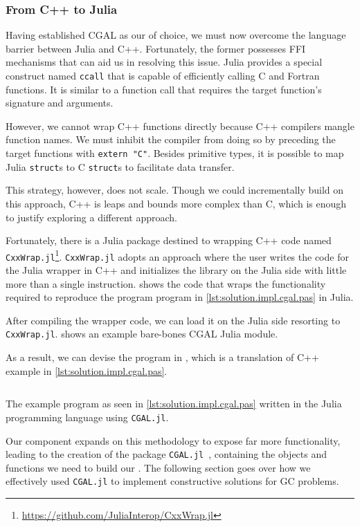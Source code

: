 \subsubsection{From C++ to Julia}%
\label{sec:solution.impl.jlcgal}

Having established \ac{CGAL} as our \geomlibrary{} of choice, we must now
overcome the language barrier between Julia and C++.  Fortunately, the former
possesses \ac{FFI} mechanisms that can aid us in resolving this issue.  Julia
provides a special construct named \texttt{ccall} that is capable of
efficiently calling C and Fortran functions.  It is similar to a function call
that requires the target function's signature and arguments.

However, we cannot wrap C++ functions directly because C++ compilers mangle
function names.  We must inhibit the compiler from doing so by preceding the
target functions with \texttt{extern "C"}.  Besides primitive types,
it is possible to map Julia \texttt{struct}s to C
\texttt{struct}s to facilitate data transfer.

This strategy, however, does not scale.  Though we could incrementally build on
this approach, C++ is leaps and bounds more complex than C, which is enough to
justify exploring a different approach.

Fortunately, there is a Julia package destined to wrapping C++ code named
\texttt{CxxWrap.jl}\footnote{\url{https://github.com/JuliaInterop/CxxWrap.jl}}.
\texttt{CxxWrap.jl} adopts an approach where the user writes the code for the
Julia wrapper in C++ and initializes the library on the Julia side with little
more than a single instruction.  
shows the code that wraps the functionality required to reproduce the program
program in \cref{lst:solution.impl.cgal.pas} in Julia.

After compiling the wrapper code, we can load it on the Julia side resorting to
\texttt{CxxWrap.jl}.  shows an example
bare-bones CGAL Julia module.

As a result, we can devise the program in ,
which is a translation of C++ example in \cref{lst:solution.impl.cgal.pas}.

\begin{listing}[htbp]
  \inputminted{julia}{jl/points_and_segments.jl}
  \caption[CGAL.jl: Three points and one segment]{
    The example program as seen in \cref{lst:solution.impl.cgal.pas} written in
    the Julia programming language using \texttt{CGAL.jl}.}%
  \label{lst:solution.impl.jlcgal.pas}
\end{listing}

Our \wrapper{} component expands on this methodology to expose far more
functionality, leading to the creation of the package
\texttt{CGAL.jl}~\cite{Ventura:2021:CGAL.jl},  containing the objects and
functions we need to build our \primitives{}.  The following section goes over
how we effectively used \texttt{CGAL.jl} to implement constructive solutions for
\ac{GC} problems.
